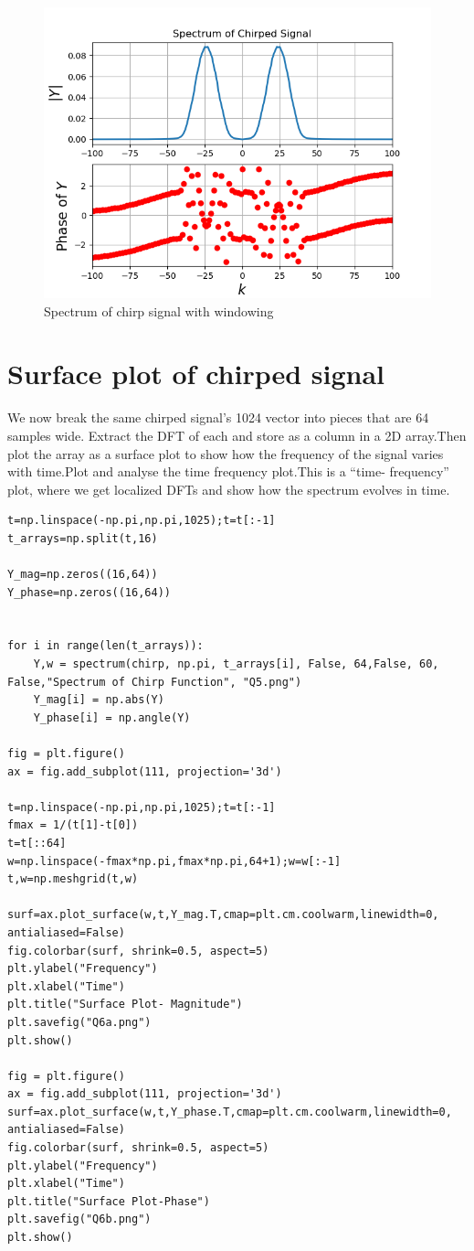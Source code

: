 \documentclass[12pt, a4paper]{report}
\begin{document}
   \begin{figure}[!tbh]
   	\centering
   	\includegraphics[scale=0.7]{Q5.png}
	\caption{Spectrum of chirp signal with windowing}
 \end{figure} 

\section*{Surface plot of chirped signal}
We now break the same chirped signal's 1024 vector into pieces that are 64 samples wide. Extract the DFT of each and store as a column in a 2D array.Then plot the array as a surface plot to show how the frequency of the signal varies with time.Plot and analyse the time frequency plot.This is a “time- frequency” plot, where we get localized DFTs and show how the spectrum evolves in time.

\footnotesize

\begin{Verbatim}
t=np.linspace(-np.pi,np.pi,1025);t=t[:-1]
t_arrays=np.split(t,16)

Y_mag=np.zeros((16,64))
Y_phase=np.zeros((16,64))


for i in range(len(t_arrays)):
    Y,w = spectrum(chirp, np.pi, t_arrays[i], False, 64,False, 60, False,"Spectrum of Chirp Function", "Q5.png")
    Y_mag[i] = np.abs(Y)
    Y_phase[i] = np.angle(Y)

fig = plt.figure()
ax = fig.add_subplot(111, projection='3d')

t=np.linspace(-np.pi,np.pi,1025);t=t[:-1]
fmax = 1/(t[1]-t[0])
t=t[::64]
w=np.linspace(-fmax*np.pi,fmax*np.pi,64+1);w=w[:-1]
t,w=np.meshgrid(t,w)

surf=ax.plot_surface(w,t,Y_mag.T,cmap=plt.cm.coolwarm,linewidth=0, antialiased=False)
fig.colorbar(surf, shrink=0.5, aspect=5)
plt.ylabel("Frequency")
plt.xlabel("Time")
plt.title("Surface Plot- Magnitude")
plt.savefig("Q6a.png")
plt.show()

fig = plt.figure()
ax = fig.add_subplot(111, projection='3d')
surf=ax.plot_surface(w,t,Y_phase.T,cmap=plt.cm.coolwarm,linewidth=0, antialiased=False)
fig.colorbar(surf, shrink=0.5, aspect=5)
plt.ylabel("Frequency")
plt.xlabel("Time")
plt.title("Surface Plot-Phase")
plt.savefig("Q6b.png")
plt.show()


\end{Verbatim}
\end{document}

